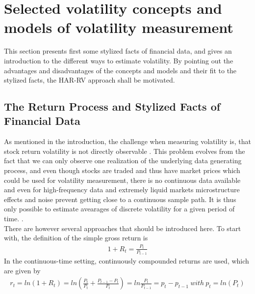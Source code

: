 
\section{Selected volatility concepts and models of volatility measurement}
This section presents first some stylized facts of financial data, and gives an introduction to the different ways to estimate volatility. By pointing out the advantages and disadvantages of the concepts and models and their fit to the stylized facts, the HAR-RV approach shall be motivated. 


\subsection{The Return Process and Stylized Facts of Financial Data}
As mentioned in the introduction, the challenge when measuring volatility is, that stock return volatility is not directly observable \parencite{tsay2005}. This problem evolves from the fact that we can only observe one realization of the underlying data generating process, and even though stocks are traded and thus have market prices which could be used for volatility measurement, there is no continuous data available and even for high-frequency data and extremely liquid markets microstructure effects and noise prevent getting close to a continuous sample path. It is thus only possible to estimate avearages of discrete volatility for a given period of time. \parencite{andersen2001}.\\
There are however several approaches that should be introduced here. To start with, the definition of the simple gross return is
\begin{align}\label{eq:return}
1+ R_{t} = \frac{P_{t}}{P_{t-1}} 
\end{align}
In the continuous-time setting, continuously compounded returns are used, which are given by
\begin{align*}
r_{t} = ln(1 + R_{t}) = ln (\frac{P_{t}}{P_{t}} + \frac{P_{t-1} - P_{t}}{P_{t}}) = 
ln \frac{P_{t}}{P_{t-1}} = p_{t} - p_{t-1} \ 
with\  p_{t} = ln(P_{t})
\end{align*}


